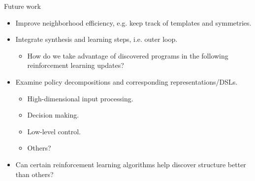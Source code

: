 \begin{frame}{Future work}
\begin{itemize}
    \item Improve neighborhood efficiency, e.g. keep track of templates and symmetries.
    \item Integrate synthesis and learning steps, i.e. outer loop.
    \begin{itemize}
        \item How do we take advantage of discovered programs in the following reinforcement learning updates?
    \end{itemize}
    \item Examine policy decompositions and corresponding representations/DSLs.
    \begin{itemize}
        \item High-dimensional input processing.
        \item Decision making.
        \item Low-level control.
        \item Others?
    \end{itemize}
    \item Can certain reinforcement learning algorithms help discover structure better than others?
\end{itemize}
\end{frame}